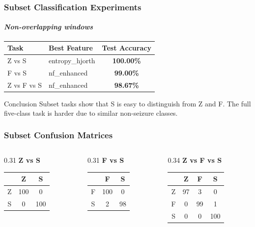 \documentclass{beamer}
\begin{document}
\begin{frame}
\frametitle{Subset Classification Experiments}
\framesubtitle{\it{Non-overlapping windows}}
\begin{table}
\centering
\begin{tabular}{llc}
\toprule
Task & Best Feature & Test Accuracy\\
\midrule
Z vs S & entropy\_hjorth & \textbf{100.00\%}\\
F vs S & nf\_enhanced & \textbf{99.00\%}\\
Z vs F vs S & nf\_enhanced & \textbf{98.67\%}\\
\bottomrule
\end{tabular}
\end{table}

\begin{block}{Conclusion}
Subset tasks show that S is easy to distinguish from Z and F. The full five-class task is harder due to similar non-seizure classes.
\end{block}
\end{frame}

\begin{frame}
\frametitle{Subset Confusion Matrices}
\begin{columns}
\begin{column}{0.31\textwidth}
\centering
\textbf{Z vs S}

\vspace{0.1cm}
\begin{tabular}{c|cc}
 & Z & S\\
\hline
Z & 100 & 0\\
S & 0 & 100\\
\end{tabular}
\end{column}

\begin{column}{0.31\textwidth}
\centering
\textbf{F vs S}

\vspace{0.1cm}
\begin{tabular}{c|cc}
 & F & S\\
\hline
F & 100 & 0\\
S & 2 & 98\\
\end{tabular}
\end{column}

\begin{column}{0.34\textwidth}
\centering
\textbf{Z vs F vs S}

\vspace{0.1cm}
\begin{tabular}{c|ccc}
 & Z & F & S\\
\hline
Z & 97 & 3 & 0\\
F & 0 & 99 & 1\\
S & 0 & 0 & 100\\
\end{tabular}
\end{column}
\end{columns}
\end{frame}
\end{document}

